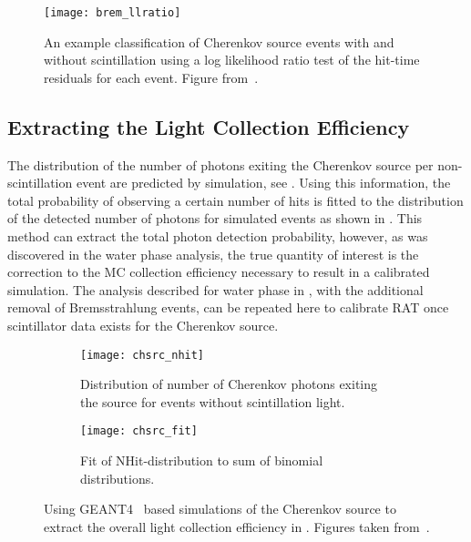 \begin{figure}
\centering
\texttt{[image: brem\_llratio]}
\caption{\label{fig:brem_llratio} An example classification of Cherenkov source events with and without scintillation using a log likelihood ratio test of the hit-time residuals for each event. Figure from~\cite{Heintzelman:2013}.}
\end{figure}


\subsection{Extracting the Light Collection Efficiency}
The distribution of the number of photons exiting the Cherenkov source per non-scintillation event are predicted by simulation, see . 
Using this information, the total probability of observing a certain number of hits is fitted to the distribution of the detected number of photons for simulated events as shown in .
This method can extract the total photon detection probability, however, as was discovered in the water phase analysis, the true quantity of interest is the correction to the MC collection efficiency necessary to result in a calibrated simulation.
The analysis described for water phase in , with the additional removal of Bremsstrahlung events, can be repeated here to calibrate RAT once scintillator data exists for the Cherenkov source.

\begin{figure}
\centering
\begin{subfigure}[t]{.75\textwidth}
\centering
\texttt{[image: chsrc\_nhit]}
\caption{Distribution of number of Cherenkov photons exiting the source for events without scintillation light.}
\label{fig:nphotons}
\end{subfigure}
\hfill
\begin{subfigure}[b]{.75\textwidth}
\centering
\texttt{[image: chsrc\_fit]}
\caption{Fit of NHit-distribution to sum of binomial distributions.}
\label{fig:fit}
\end{subfigure}
\caption{Using GEANT4~\cite{geant4} based simulations of the Cherenkov source to extract the overall light collection efficiency in {\snop}. Figures taken from~\cite{Heintzelman:2013}. }
\label{fig:heintzelman-plots}
\end{figure}

